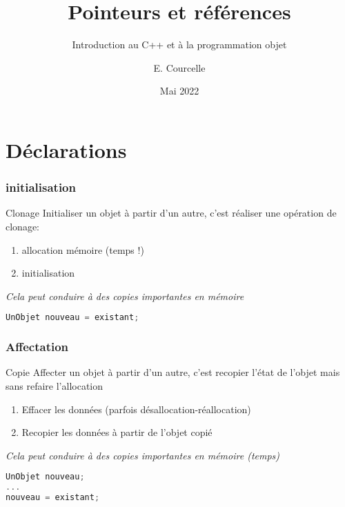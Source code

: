 \documentclass{beamer}
\title{Pointeurs et références}
\subtitle{Introduction au C++ et à la programmation objet}
\author{E. Courcelle}\institute{CALMIP, URA 3669}
\date{Mai 2022}
\begin{document}
\begin{frame}
\titlepage
\end{frame}

\begin{frame}
\tableofcontents
\end{frame}

\section{Déclarations}

\begin{frame}[fragile=singleslide,shrink=20]
\frametitle {initialisation}

\begin{block}{Clonage}
Initialiser un objet à partir d'un autre, c'est réaliser une opération de clonage:
\begin{enumerate}
\item allocation mémoire (temps !)
\item initialisation
\end{enumerate}
\em Cela peut conduire à des copies importantes en mémoire
\end{block}

\begin{lstlisting}[language=c++]
UnObjet nouveau = existant;
\end{lstlisting}
\end{frame}

\begin{frame}[fragile=singleslide,shrink=20]
\frametitle {Affectation}

\begin{block}{Copie}
Affecter un objet à partir d'un autre, c'est recopier l'état de l'objet mais sans refaire l'allocation
\begin{enumerate}
\item Effacer les données (parfois désallocation-réallocation)
\item Recopier les données à partir de l'objet copié
\end{enumerate}
\em Cela peut conduire à des copies importantes en mémoire (temps)
\end{block}

\begin{lstlisting}[language=c++]
UnObjet nouveau;
...
nouveau = existant;
\end{lstlisting}
\end{frame}
\end{document}
